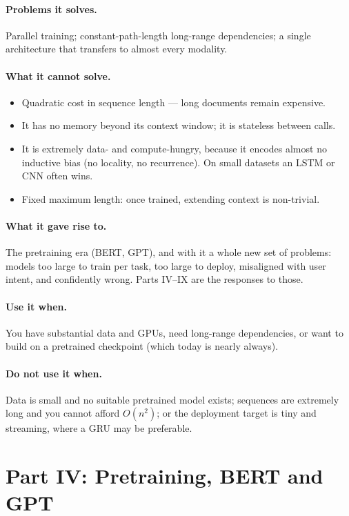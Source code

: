\documentclass[11pt,a4paper]{article}
\begin{document}
\paragraph{Problems it solves.} Parallel training; constant-path-length long-range
dependencies; a single architecture that transfers to almost every modality.

\paragraph{What it cannot solve.}
\begin{itemize}
\item Quadratic cost in sequence length --- long documents remain expensive.
\item It has no memory beyond its context window; it is stateless between calls.
\item It is extremely data- and compute-hungry, because it encodes almost no inductive bias
  (no locality, no recurrence). On small datasets an LSTM or CNN often wins.
\item Fixed maximum length: once trained, extending context is non-trivial.
\end{itemize}

\paragraph{What it gave rise to.} The pretraining era (BERT, GPT), and with it a whole new
set of problems: models too large to train per task, too large to deploy, misaligned with
user intent, and confidently wrong. Parts IV--IX are the responses to those.

\paragraph{Use it when.} You have substantial data and GPUs, need long-range dependencies,
or want to build on a pretrained checkpoint (which today is nearly always).

\paragraph{Do not use it when.} Data is small and no suitable pretrained model exists;
sequences are extremely long and you cannot afford $O(n^2)$; or the deployment target is
tiny and streaming, where a GRU may be preferable.

\section{Part IV: Pretraining, BERT and GPT}
\end{document}

